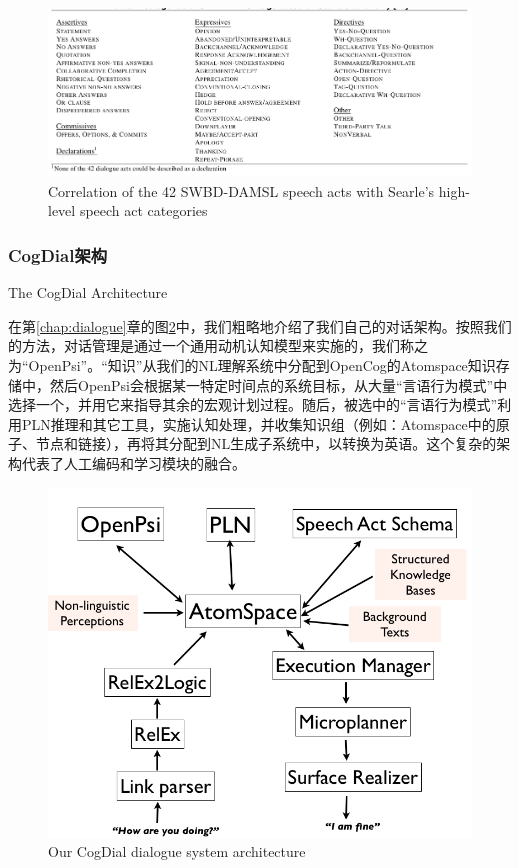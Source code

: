 \begin{figure}[htb]
\centering
\includegraphics[width=12cm]{figures/Searle.png}
\caption{ Correlation of the 42 SWBD-DAMSL speech acts with Searle's high-level speech act categories }
\label{fig:Searle}
\end{figure}

\subsubsection{CogDial架构}{The CogDial Architecture}

在第\ref{chap:dialogue}章的图\ref{fig:cogdial}中，我们粗略地介绍了我们自己的对话架构。按照我们的方法，对话管理是通过一个通用动机认知模型来实施的，我们称之为“OpenPsi”。“知识”从我们的NL理解系统中分配到OpenCog的Atomspace知识存储中，然后OpenPsi会根据某一特定时间点的系统目标，从大量“言语行为模式”中选择一个，并用它来指导其余的宏观计划过程。随后，被选中的“言语行为模式”利用PLN推理和其它工具，实施认知处理，并收集知识组（例如：Atomspace中的原子、节点和链接），再将其分配到NL生成子系统中，以转换为英语。这个复杂的架构代表了人工编码和学习模块的融合。
 
\begin{figure}[htb]
\centering
\includegraphics[width=12cm]{figures/cogdial.png}
\caption{ Our CogDial dialogue system architecture }
\label{fig:cogdial}
\end{figure}
